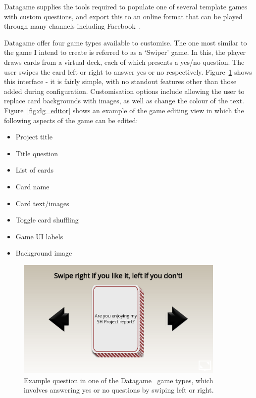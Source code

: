 Datagame supplies the tools required to populate one of several template games with custom questions, and export this to an online format that can be played through many channels including Facebook~\cite{Facebook}. 

Datagame offer four game types available to customise. The one most similar to the game I intend to create is referred to as a `Swiper' game. In this, the player draws cards from a virtual deck, each of which presents a yes/no question. The user swipes the card left or right to answer yes or no respectively. Figure~\ref{fig:datagame} shows this interface - it is fairly simple, with no standout features other than those added during configuration. Customisation options include allowing the user to replace card backgrounds with images, as well as change the colour of the text. Figure~\ref{fig:dg_editor} shows an example of the game editing view in which the following aspects of the game can be edited:

\begin{itemize}
    \item Project title
    \item Title question
    \item List of cards
    \item Card name
    \item Card text/images
    \item Toggle card shuffling
    \item Game UI labels
    \item Background image
\end{itemize}

\begin{figure}[!h]
	\centering
	\includegraphics[width=0.9\textwidth]{./images/context/datagame.png}
	\caption{Example question in one of the Datagame~\cite{Datagame} game types, which involves answering yes or no questions by swiping left or right.}
	\label{fig:datagame}
\end{figure}


